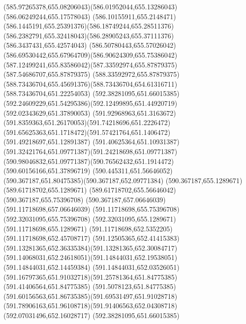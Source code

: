 {{	\curveto(585.97265378,655.08206043)(586.01952044,655.13286043)(586.06249244,655.17578043)
	\curveto(586.10155911,655.2148471)(586.1445191,655.25391376)(586.18749244,655.28511376)
	\curveto(586.2382791,655.32418043)(586.28905243,655.37111376)(586.3437431,655.42574043)
	\curveto(586.50780443,655.57026042)(586.69530442,655.67964709)(586.90624309,655.75386042)
	\curveto(587.12499241,655.83586042)(587.33592974,655.87879375)(587.54686707,655.87879375)
	\curveto(588.33592972,655.87879375)(588.73436704,655.45691376)(588.73436704,654.61316711)
	\lineto(588.73436704,651.22254053)
	\closepath
	\moveto(592.38281095,651.66015385)
	\curveto(592.24609229,651.54295386)(592.12499895,651.44920719)(592.02343629,651.37890053)
	\curveto(591.92968963,651.3163672)(591.8359363,651.26170053)(591.74218696,651.2226472)
	\curveto(591.65625363,651.1718472)(591.57421764,651.1406472)(591.49218697,651.12891387)
	\curveto(591.40625364,651.10931387)(591.32421764,651.09771387)(591.24218698,651.09771387)
	\curveto(590.98046832,651.09771387)(590.76562432,651.1914472)(590.60156166,651.37896719)
	\curveto(590.445311,651.56646052)(590.367187,651.80475385)(590.367187,652.09771384)
	\lineto(590.367187,655.1289671)
	\lineto(589.61718702,655.1289671)
	\lineto(589.61718702,655.56646042)
	\lineto(590.367187,655.75396708)
	\lineto(590.367187,657.06646039)
	\lineto(591.11718698,657.06646039)
	\lineto(591.11718698,655.75396708)
	\lineto(592.32031095,655.75396708)
	\lineto(592.32031095,655.1289671)
	\lineto(591.11718698,655.1289671)
	\lineto(591.11718698,652.5352205)
	\lineto(591.11718698,652.45708717)
	\curveto(591.12505365,652.41415383)(591.13281365,652.36335384)(591.13281365,652.30084717)
	\curveto(591.14068031,652.24618051)(591.14844031,652.19538051)(591.14844031,652.14459384)
	\lineto(591.14844031,652.03526051)
	\curveto(591.16797365,651.91032718)(591.25781364,651.84775385)(591.41406564,651.84775385)
	\curveto(591.5078123,651.84775385)(591.60156563,651.86735385)(591.69531497,651.91028718)
	\curveto(591.78906163,651.96108718)(591.91406563,652.04308718)(592.07031496,652.16028717)
	\closepath
	\moveto(592.38281095,651.66015385)
}
}

